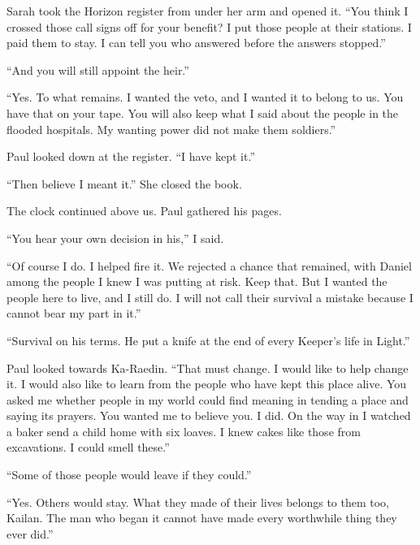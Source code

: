 Sarah took the Horizon register from under her arm and opened it. ``You think I crossed those call signs off for your benefit? I put those people at their stations. I paid them to stay. I can tell you who answered before the answers stopped.''\par

``And you will still appoint the heir.''\par

``Yes. To what remains. I wanted the veto, and I wanted it to belong to us. You have that on your tape. You will also keep what I said about the people in the flooded hospitals. My wanting power did not make them soldiers.''\par

Paul looked down at the register. ``I have kept it.''\par

``Then believe I meant it.'' She closed the book.\par

The clock continued above us. Paul gathered his pages.\par

``You hear your own decision in his,'' I said.\par

``Of course I do. I helped fire it. We rejected a chance that remained, with Daniel among the people I knew I was putting at risk. Keep that. But I wanted the people here to live, and I still do. I will not call their survival a mistake because I cannot bear my part in it.''\par

``Survival on his terms. He put a knife at the end of every Keeper's life in Light.''\par

Paul looked towards Ka-Raedin. ``That must change. I would like to help change it. I would also like to learn from the people who have kept this place alive. You asked me whether people in my world could find meaning in tending a place and saying its prayers. You wanted me to believe you. I did. On the way in I watched a baker send a child home with six loaves. I knew cakes like those from excavations. I could smell these.''\par

``Some of those people would leave if they could.''\par

``Yes. Others would stay. What they made of their lives belongs to them too, Kailan. The man who began it cannot have made every worthwhile thing they ever did.''\par

